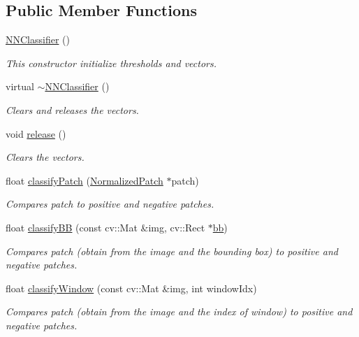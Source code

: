 \subsection*{Public Member Functions}
\begin{DoxyCompactItemize}
\item 
\hyperlink{classtld_1_1NNClassifier_a5a71057c2aacdd4935247976e6f49b46}{N\-N\-Classifier} ()
\begin{DoxyCompactList}\small\item\em This constructor initialize thresholds and vectors. \end{DoxyCompactList}\item 
virtual \hyperlink{classtld_1_1NNClassifier_a475f200dea8dc71cf0f273c57d837242}{$\sim$\-N\-N\-Classifier} ()
\begin{DoxyCompactList}\small\item\em Clears and releases the vectors. \end{DoxyCompactList}\item 
void \hyperlink{classtld_1_1NNClassifier_aabb548e7b9535ad8040fe65d344b3142}{release} ()
\begin{DoxyCompactList}\small\item\em Clears the vectors. \end{DoxyCompactList}\item 
float \hyperlink{classtld_1_1NNClassifier_aa59628d72a448c3ee686d9fd78d3e62a}{classify\-Patch} (\hyperlink{classtld_1_1NormalizedPatch}{Normalized\-Patch} $\ast$patch)
\begin{DoxyCompactList}\small\item\em Compares patch to positive and negative patches. \end{DoxyCompactList}\item 
float \hyperlink{classtld_1_1NNClassifier_a4b926da10ab0ce0d05fdb19b7e90bf8b}{classify\-B\-B} (const cv\-::\-Mat \&img, cv\-::\-Rect $\ast$\hyperlink{namespacetld_aa5e13bbb9a53d3e9103d430b6113b08b}{bb})
\begin{DoxyCompactList}\small\item\em Compares patch (obtain from the image and the bounding box) to positive and negative patches. \end{DoxyCompactList}\item 
float \hyperlink{classtld_1_1NNClassifier_a88fe1649014e887a12a5a57a552819f2}{classify\-Window} (const cv\-::\-Mat \&img, int window\-Idx)
\begin{DoxyCompactList}\small\item\em Compares patch (obtain from the image and the index of window) to positive and negative patches. \end{DoxyCompactList}\item 

\end{DoxyCompactItemize}
